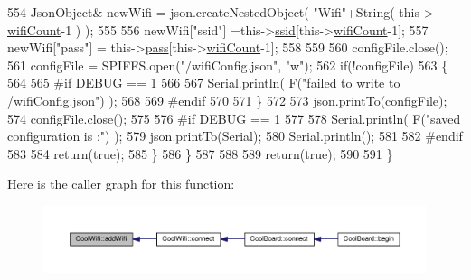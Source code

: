 \begin{DoxyCode}
554             JsonObject& newWifi = json.createNestedObject( \textcolor{stringliteral}{"Wifi"}+String( this->
      \hyperlink{classCoolWifi_ab133bd92fcb895b884deecd6678592e4}{wifiCount}-1 ) );
555             
556             newWifi[\textcolor{stringliteral}{"ssid"}] =this->\hyperlink{classCoolWifi_a893b21d0fed821438733bba2e73fb4c2}{ssid}[this->\hyperlink{classCoolWifi_ab133bd92fcb895b884deecd6678592e4}{wifiCount}-1];
557             newWifi[\textcolor{stringliteral}{"pass"}] = this->\hyperlink{classCoolWifi_a0c3332a149245aaad060b32593a54c9b}{pass}[this->\hyperlink{classCoolWifi_ab133bd92fcb895b884deecd6678592e4}{wifiCount}-1];
558             
559 
560             configFile.close();
561             configFile = SPIFFS.open(\textcolor{stringliteral}{"/wifiConfig.json"}, \textcolor{stringliteral}{"w"});
562             \textcolor{keywordflow}{if}(!configFile)
563             \{
564             
565 \textcolor{preprocessor}{            #if DEBUG == 1 }
566 
567                 Serial.println( F(\textcolor{stringliteral}{"failed to write to /wifiConfig.json"}) );
568             
569 \textcolor{preprocessor}{            #endif}
570 
571             \}
572             
573             json.printTo(configFile);
574             configFile.close();
575 
576 \textcolor{preprocessor}{        #if DEBUG == 1 }
577 
578             Serial.println( F(\textcolor{stringliteral}{"saved configuration is :"}) );
579             json.printTo(Serial);
580             Serial.println();
581         
582 \textcolor{preprocessor}{        #endif}
583 
584             \textcolor{keywordflow}{return}(\textcolor{keyword}{true}); 
585         \}
586     \}   
587 
588     
589     \textcolor{keywordflow}{return}(\textcolor{keyword}{true});
590     
591 \}
\end{DoxyCode}
Here is the caller graph for this function\+:\nopagebreak
\begin{figure}[H]
\begin{center}
\leavevmode
\includegraphics[width=350pt]{classCoolWifi_a914d7a1df14dd6b75345fb614c34e9d6_icgraph}
\end{center}
\end{figure}
\mbox{\label{classCoolWifi_a46942fed90e475112cc10b78a32e7aaa}} 
